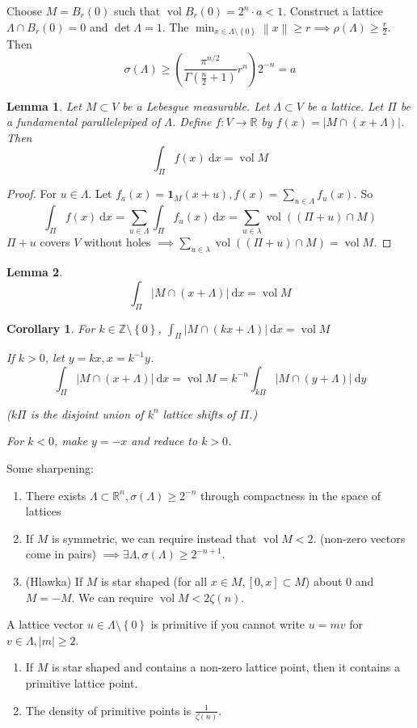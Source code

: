 \documentclass{report}
\newcommand{\R}{\mathbb{R}}
\newcommand{\Z}{\mathbb{Z}}
\newcommand{\vol}{\operatorname{vol}}
\newcommand{\idf}{\ \mathrm{d}}
\newcommand{\norm}[1]{\left\| #1 \right\|}
\newcommand{\set}[1]{\left\{ #1 \right\}}
\newtheorem{corollary}{Corollary}[section]
\newtheorem{lemma}{Lemma}[section]
\theoremstyle{definition}
\theoremstyle{remark}
\numberwithin{equation}{section}
\begin{document}
Choose $M = B_r(0)$ such that  $\vol B_r(0) = 2^n \cdot a < 1$. Construct a lattice $\Lambda \cap B_r(0) = 0$ and $\det \Lambda = 1$. The $\min_{x \in \Lambda \setminus \set{0}} \norm{x} \geq r \implies \rho(\Lambda) \geq \frac{r}{2}$. Then \[
    \sigma(\Lambda) \geq \left(\frac{\pi^{n/2}}{\Gamma(\frac{n}{2}+1)}r^n\right)2^{-n} = a\]
\begin{lemma}
    Let $M \subset V$ be a Lebesgue measurable. Let $\Lambda \subset V$ be a lattice. Let $\Pi$ be a fundamental parallelepiped of $\Lambda$. Define $f: V \to \R$ by $f(x) = |M \cap (x + \Lambda)|$. Then \[\int_\Pi f(x) \idf x = \vol M\]
\end{lemma}
\begin{proof}
    For $u \in \Lambda$. Let $f_a(x) = \mathbf{1}_{M}(x+u), f(x) = \sum_{u\in \Lambda} f_u(x)$. So \[
    \int_\Pi f(x) \idf x = \sum_{u \in \Lambda} \int_\Pi f_u(x) \idf x = \sum_{u \in \lambda} \vol ((\Pi + u) \cap M)    
    \]
    $\Pi + u$ covers $V$ without holes $\implies \sum_{u \in \lambda} \vol ((\Pi + u) \cap M) = \vol M$.
\end{proof}
\begin{lemma}
    \[\int_\Pi |M \cap (x + \Lambda)| \idf x = \vol M\]
\end{lemma}
\begin{corollary}
    For $k \in \Z \setminus \set{0}$, $\int_\Pi |M \cap (kx + \Lambda)| \idf x = \vol M$

    If $k > 0$, let $y = kx, x = k^{-1}y$. \[\int_\Pi |M \cap (x + \Lambda)| \idf x = \vol M = k^{-n}\int_{k\Pi} |M \cap (y + \Lambda)| \idf y\]

    ($k\Pi$ is the disjoint union of $k^n$ lattice shifts of $\Pi$.)

    For $k < 0$, make $y = -x$ and reduce to $k > 0$.
\end{corollary}

Some sharpening: \begin{enumerate}
    \item There exists $\Lambda \subset \R^n, \sigma (\Lambda) \geq 2^{-n}$ through compactness in the space of lattices
    \item If $M$ is symmetric, we can require instead that $\vol M < 2$. (non-zero vectors come in pairs) $\implies \exists \Lambda, \sigma (\Lambda) \geq 2^{-n+1}$.
    \item (Hlawka) If $M$ is star shaped (for all $x \in M, [0, x] \subset M$) about $0$ and $M = -M$. We can require $\vol M < 2 \zeta(n)$.
\end{enumerate}
A lattice vector $u \in \Lambda \setminus \set{0}$ is primitive if you cannot write $u = mv$ for $v \in \Lambda, |m| \geq 2$.
\begin{enumerate}
    \item If $M$ is star shaped and contains a non-zero lattice point, then it contains a primitive lattice point.
    \item The density of primitive points is $\frac{1}{\zeta(n)}$.
\end{enumerate}
\end{document}
